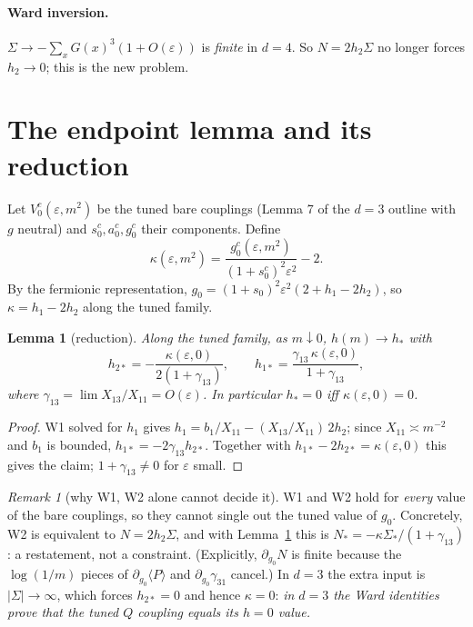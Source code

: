 \documentclass[11pt]{article}
\newtheorem{lemma}[theorem]{Lemma}
\theoremstyle{definition}
\theoremstyle{remark}
\newtheorem{remark}[theorem]{Remark}
\newcommand{\avg}[1]{\langle #1\rangle}
\newcommand{\eps}{\varepsilon}
\begin{document}
\paragraph{Ward inversion.} $\Sigma\to-\sum_xG(x)^3(1+O(\eps))$ is \emph{finite} in $d=4$.
So $N=2h_2\Sigma$ no longer forces $h_2\to0$; this is the new problem.

\section{The endpoint lemma and its reduction}

Let $V_0^c(\eps,m^2)$ be the tuned bare couplings (Lemma 7 of the $d=3$ outline with $g$
neutral) and $s_0^c,a_0^c,g_0^c$ their components. Define
\begin{equation}\label{e:kappa}
  \kappa(\eps,m^2)=\frac{g_0^c(\eps,m^2)}{(1+s_0^c)^2\eps^2}-2 .
\end{equation}
By the fermionic representation, $g_0=(1+s_0)^2\eps^2(2+h_1-2h_2)$, so
$\kappa=h_1-2h_2$ along the tuned family.

\begin{lemma}[reduction]\label{lem:reduce}
  Along the tuned family, as $m\downarrow0$, $h(m)\to h_*$ with
  \[
    h_{2*}=-\frac{\kappa(\eps,0)}{2(1+\gamma_{13})},\qquad
    h_{1*}=\frac{\gamma_{13}\,\kappa(\eps,0)}{1+\gamma_{13}},
  \]
  where $\gamma_{13}=\lim X_{13}/X_{11}=O(\eps)$. In particular $h_*=0$ iff $\kappa(\eps,0)=0$.
\end{lemma}
\begin{proof}
W1 solved for $h_1$ gives $h_1=b_1/X_{11}-(X_{13}/X_{11})\,2h_2$; since $X_{11}\asymp m^{-2}$
and $b_1$ is bounded, $h_{1*}=-2\gamma_{13}h_{2*}$. Together with
$h_{1*}-2h_{2*}=\kappa(\eps,0)$ this gives the claim; $1+\gamma_{13}\neq0$ for $\eps$ small.
\end{proof}

\begin{remark}[why W1, W2 alone cannot decide it]
  W1 and W2 hold for \emph{every} value of the bare couplings, so they cannot single out
  the tuned value of $g_0$. Concretely, W2 is equivalent to $N=2h_2\Sigma$, and with
  Lemma~\ref{lem:reduce} this is $N_*=-\kappa\Sigma_*/(1+\gamma_{13})$: a restatement, not a
  constraint. (Explicitly, $\partial_{g_0}N$ is finite because the $\log(1/m)$ pieces of
  $\partial_{g_0}\avg{P}$ and $\partial_{g_0}\gamma_{31}$ cancel.) In $d=3$ the extra input is
  $|\Sigma|\to\infty$, which forces $h_{2*}=0$ and hence $\kappa=0$: \emph{in $d=3$ the Ward
  identities prove that the tuned $Q$ coupling equals its $h=0$ value.}
\end{remark}
\end{document}
